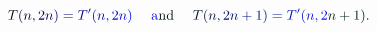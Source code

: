\documentclass[12pt]{article}
\begin{document}
\makeatletter
\renewcommand*{\@textcolor}[3]{%
  \protect\leavevmode
  \begingroup
    \color#1{#2}#3%
  \endgroup
}
\makeatother
\begin{displaymath}
\mathcolor[RGB]{0,0,15}{T} \mathcolor[RGB]{0,0,30}{(} \mathcolor[RGB]{0,0,45}{n} \mathcolor[RGB]{0,0,60}{,} \mathcolor[RGB]{0,0,75}{2} \mathcolor[RGB]{0,0,90}{n} \mathcolor[RGB]{0,0,105}{)} \mathcolor[RGB]{0,0,120}{=} \mathcolor[RGB]{0,0,135}{T} ^ { \mathcolor[RGB]{0,0,150}{\prime} } \mathcolor[RGB]{0,0,165}{(} \mathcolor[RGB]{0,0,180}{n} \mathcolor[RGB]{0,0,195}{,} \mathcolor[RGB]{0,0,210}{2} \mathcolor[RGB]{0,0,225}{n} \mathcolor[RGB]{0,0,240}{)} \quad \mathrm { ~ \mathcolor[RGB]{0,0,255}{a} \mathcolor[RGB]{0,15,0}{n} \mathcolor[RGB]{0,15,15}{d} ~ } \quad \mathcolor[RGB]{0,15,30}{T} \mathcolor[RGB]{0,15,45}{(} \mathcolor[RGB]{0,15,60}{n} \mathcolor[RGB]{0,15,75}{,} \mathcolor[RGB]{0,15,90}{2} \mathcolor[RGB]{0,15,105}{n} \mathcolor[RGB]{0,15,120}{+} \mathcolor[RGB]{0,15,135}{1} \mathcolor[RGB]{0,15,150}{)} \mathcolor[RGB]{0,15,165}{=} \mathcolor[RGB]{0,15,180}{T} ^ { \mathcolor[RGB]{0,15,195}{\prime} } \mathcolor[RGB]{0,15,210}{(} \mathcolor[RGB]{0,15,225}{n} \mathcolor[RGB]{0,15,240}{,} \mathcolor[RGB]{0,15,255}{2} \mathcolor[RGB]{0,30,0}{n} \mathcolor[RGB]{0,30,15}{+} \mathcolor[RGB]{0,30,30}{1} \mathcolor[RGB]{0,30,45}{)} \mathcolor[RGB]{0,30,60}{.}
\end{displaymath}
\end{document}

